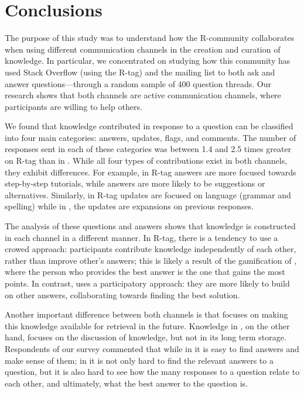 \section{Conclusions}
\label{cha:conclusion}

The purpose of this study was to understand how the R-community collaborates when using different communication channels in the creation and curation of knowledge.
In particular, we concentrated on studying how this community has used Stack Overflow (using the R-tag) and the \RH mailing list to both ask and answer questions---through a random sample of 400 question threads. Our research shows that both channels are active communication channels, where participants are willing to help others. 

We found that knowledge contributed in response to a question can be classified into four main categories: answers, updates, flags, and comments. The number of
responses sent in each of these categories was between 1.4 and 2.5 times greater on \SO R-tag than in \RH. While all four types of contributions exist in both
channels, they exhibit differences. For example, in \SO R-tag answers are more focused towards step-by-step tutorials, while \RH answers are more
likely to be suggestions or alternatives. Similarly, in \SO R-tag updates are focused on language (grammar and spelling) while in \RH, the updates are
expansions on previous responses.

The analysis of these questions and answers shows that knowledge is constructed in each channel in a different manner. In \SO R-tag, there is a tendency to use
a crowed approach: participants contribute knowledge independently of each other, rather than improve other's answers; this is likely a result of the
gamification of \SO, where the person who provides the best answer is the one that gains the most points.
In contrast, \RH uses a participatory approach: they are more likely to build on other answers, collaborating towards finding the best solution.

Another important difference between both channels is that \SO focuses on making this knowledge available for retrieval in the future. Knowledge in \RH, on the
other hand, focuses on the discussion of knowledge, but not in its long term storage. Respondents of our survey commented that while in \SO it is easy to find answers
and make sense of them; in \RH it is not only hard to find the relevant answers to a question, but it is also hard to see how the many responses to a question
relate to each other, and ultimately, what the best answer to the question is.

